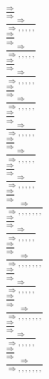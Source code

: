 \documentclass[11pt]{article}
\begin{document}
\begin{center}
\bigskip
\\$\frac{\Rightarrow }{\Rightarrow }$
\bigskip
\\$\frac{\Rightarrow }{\Rightarrow , , , , , }$
\bigskip
\\$\frac{\Rightarrow }{\Rightarrow }$
\bigskip
\\$\frac{\Rightarrow }{\Rightarrow , , , , , }$
\bigskip
\\$\frac{\Rightarrow }{\Rightarrow }$
\bigskip
\\$\frac{\Rightarrow }{\Rightarrow , , , , , }$
\bigskip
\\$\frac{\Rightarrow }{\Rightarrow }$
\bigskip
\\$\frac{\Rightarrow }{\Rightarrow , , , , , }$
\bigskip
\\$\frac{\Rightarrow }{\Rightarrow }$
\bigskip
\\$\frac{\Rightarrow }{\Rightarrow , , , , , }$
\bigskip
\\$\frac{\Rightarrow }{\Rightarrow }$
\bigskip
\\$\frac{\Rightarrow }{\Rightarrow , , , , , }$
\bigskip
\\$\frac{\Rightarrow }{\Rightarrow }$
\bigskip
\\$\frac{\Rightarrow }{\Rightarrow , , , , , }$
\bigskip
\\$\frac{\Rightarrow }{\Rightarrow }$
\bigskip
\\$\frac{\Rightarrow }{\Rightarrow , , , , , , , }$
\bigskip
\\$\frac{\Rightarrow }{\Rightarrow }$
\bigskip
\\$\frac{\Rightarrow }{\Rightarrow , , , , , }$
\bigskip
\\$\frac{\Rightarrow }{\Rightarrow }$
\bigskip
\\$\frac{\Rightarrow }{\Rightarrow , , , , , , , }$
\bigskip
\\$\frac{\Rightarrow }{\Rightarrow }$
\bigskip
\\$\frac{\Rightarrow }{\Rightarrow , , , , , }$
\bigskip
\\$\frac{\Rightarrow }{\Rightarrow }$
\bigskip
\\$\frac{\Rightarrow }{\Rightarrow , , , , , , , }$
\bigskip
\\$\frac{\Rightarrow }{\Rightarrow }$
\bigskip
\\$\frac{\Rightarrow }{\Rightarrow , , , , , }$
\bigskip
\\$\frac{\Rightarrow }{\Rightarrow }$
\bigskip
\\$\frac{\Rightarrow }{\Rightarrow , , , , , , , }$
\bigskip

\end{center}
\end{document}
